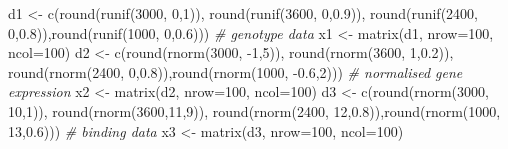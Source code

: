 \documentclass[
]{article}
\newenvironment{Shaded}{\begin{snugshade}}{\end{snugshade}}
\newcommand{\AttributeTok}[1]{\textcolor[rgb]{0.77,0.63,0.00}{#1}}
\newcommand{\CommentTok}[1]{\textcolor[rgb]{0.56,0.35,0.01}{\textit{#1}}}
\newcommand{\DecValTok}[1]{\textcolor[rgb]{0.00,0.00,0.81}{#1}}
\newcommand{\FloatTok}[1]{\textcolor[rgb]{0.00,0.00,0.81}{#1}}
\newcommand{\FunctionTok}[1]{\textcolor[rgb]{0.00,0.00,0.00}{#1}}
\newcommand{\NormalTok}[1]{#1}
\newcommand{\OtherTok}[1]{\textcolor[rgb]{0.56,0.35,0.01}{#1}}
\newcommand{\SpecialCharTok}[1]{\textcolor[rgb]{0.00,0.00,0.00}{#1}}
\begin{document}
\begin{Shaded}
\begin{Highlighting}[]
\NormalTok{d1 }\OtherTok{\textless{}{-}} \FunctionTok{c}\NormalTok{(}\FunctionTok{round}\NormalTok{(}\FunctionTok{runif}\NormalTok{(}\DecValTok{3000}\NormalTok{, }\DecValTok{0}\NormalTok{,}\DecValTok{1}\NormalTok{)),  }\FunctionTok{round}\NormalTok{(}\FunctionTok{runif}\NormalTok{(}\DecValTok{3600}\NormalTok{, }\DecValTok{0}\NormalTok{,}\FloatTok{0.9}\NormalTok{)),}
        \FunctionTok{round}\NormalTok{(}\FunctionTok{runif}\NormalTok{(}\DecValTok{2400}\NormalTok{, }\DecValTok{0}\NormalTok{,}\FloatTok{0.8}\NormalTok{)),}\FunctionTok{round}\NormalTok{(}\FunctionTok{runif}\NormalTok{(}\DecValTok{1000}\NormalTok{, }\DecValTok{0}\NormalTok{,}\FloatTok{0.6}\NormalTok{))) }\CommentTok{\# genotype data}
\NormalTok{x1 }\OtherTok{\textless{}{-}} \FunctionTok{matrix}\NormalTok{(d1, }\AttributeTok{nrow=}\DecValTok{100}\NormalTok{, }\AttributeTok{ncol=}\DecValTok{100}\NormalTok{)}
\NormalTok{d2 }\OtherTok{\textless{}{-}} \FunctionTok{c}\NormalTok{(}\FunctionTok{round}\NormalTok{(}\FunctionTok{rnorm}\NormalTok{(}\DecValTok{3000}\NormalTok{, }\SpecialCharTok{{-}}\DecValTok{1}\NormalTok{,}\DecValTok{5}\NormalTok{)),  }\FunctionTok{round}\NormalTok{(}\FunctionTok{rnorm}\NormalTok{(}\DecValTok{3600}\NormalTok{, }\DecValTok{1}\NormalTok{,}\FloatTok{0.2}\NormalTok{)),}
        \FunctionTok{round}\NormalTok{(}\FunctionTok{rnorm}\NormalTok{(}\DecValTok{2400}\NormalTok{, }\DecValTok{0}\NormalTok{,}\FloatTok{0.8}\NormalTok{)),}\FunctionTok{round}\NormalTok{(}\FunctionTok{rnorm}\NormalTok{(}\DecValTok{1000}\NormalTok{, }\SpecialCharTok{{-}}\FloatTok{0.6}\NormalTok{,}\DecValTok{2}\NormalTok{)))}
      \CommentTok{\# normalised gene expression}
\NormalTok{x2 }\OtherTok{\textless{}{-}} \FunctionTok{matrix}\NormalTok{(d2, }\AttributeTok{nrow=}\DecValTok{100}\NormalTok{, }\AttributeTok{ncol=}\DecValTok{100}\NormalTok{)}
\NormalTok{d3 }\OtherTok{\textless{}{-}} \FunctionTok{c}\NormalTok{(}\FunctionTok{round}\NormalTok{(}\FunctionTok{rnorm}\NormalTok{(}\DecValTok{3000}\NormalTok{, }\DecValTok{10}\NormalTok{,}\DecValTok{1}\NormalTok{)),  }\FunctionTok{round}\NormalTok{(}\FunctionTok{rnorm}\NormalTok{(}\DecValTok{3600}\NormalTok{,}\DecValTok{11}\NormalTok{,}\DecValTok{9}\NormalTok{)),}
        \FunctionTok{round}\NormalTok{(}\FunctionTok{rnorm}\NormalTok{(}\DecValTok{2400}\NormalTok{, }\DecValTok{12}\NormalTok{,}\FloatTok{0.8}\NormalTok{)),}\FunctionTok{round}\NormalTok{(}\FunctionTok{rnorm}\NormalTok{(}\DecValTok{1000}\NormalTok{, }\DecValTok{13}\NormalTok{,}\FloatTok{0.6}\NormalTok{))) }\CommentTok{\# binding data}
\NormalTok{x3 }\OtherTok{\textless{}{-}} \FunctionTok{matrix}\NormalTok{(d3, }\AttributeTok{nrow=}\DecValTok{100}\NormalTok{, }\AttributeTok{ncol=}\DecValTok{100}\NormalTok{)}

\end{Highlighting}
\end{Shaded}
\end{document}
